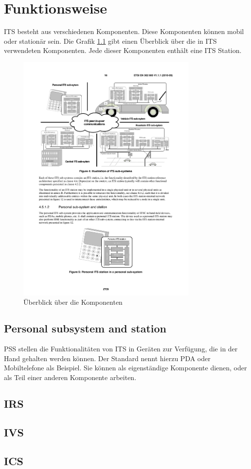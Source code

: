 \chapter{Funktionsweise \label{chap_funktionsweise}}
\ac{ITS} besteht aus verschiedenen Komponenten. Diese Komponenten können mobil oder stationär sein. Die Grafik \ref{fig:funktionsweise_komponentenueberblick} gibt einen Überblick über die in \ac{ITS} verwendeten Komponenten. Jede dieser Komponenten enthält eine \ac{ITS} Station.

\begin{figure}
\includegraphics[width=0.8\textwidth]{content/images/01_funktionsweise/ueberblick-ITS-subsystems.pdf}
\caption{Überblick über die Komponenten \cite{etsi2010302}}
\label{fig:funktionsweise_komponentenueberblick}
\end{figure}

\section{Personal subsystem and station}
\ac{PSS} stellen die Funktionalitäten von \ac{ITS} in Geräten zur Verfügung, die in der Hand gehalten werden können. Der Standard nennt hierzu \ac{PDA} oder Mobiltelefone als Beispiel. Sie können als eigenständige Komponente dienen, oder als Teil einer anderen Komponente arbeiten.

\section{IRS}

\section{IVS}

\section{ICS}
